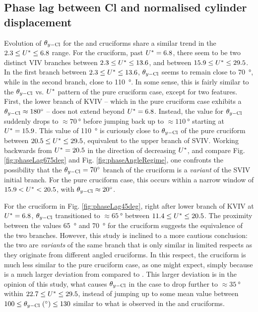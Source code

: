 \documentclass[oneside]{utmthesis}
\begin{document}
\subsection{Phase lag between Cl and normalised cylinder displacement} \label{ssec:phaseLag67545}
Evolution of $\theta_{y-\text{Cl}}$ for the \angfo{} and \angth{} cruciforms share a similar trend in the $2.3 \leq U^{*} \leq 6.8$ range. For the \angfo{} cruciform, past $U^{*} = 6.8$, there seem to be two distinct VIV branches between $2.3 \leq U^{*} \leq 13.6$, and between $15.9 \leq U^{*} \leq 29.5$. In the first branch between $2.3 \leq U^{*} \leq 13.6$, $\theta_{y-\text{Cl}}$ seems to remain close to \SI{70}{\degree}, while in the second branch, close to \SI{110}{\degree}. In some sense, this is fairly similar to the $\theta_{y-\text{Cl}}$ vs. $U^{*}$ pattern of the pure cruciform case, except for two features. First, the lower branch of KVIV -- which in the pure cruciform case exhibits a $\plag \approx \SI{180}{\degree}$ -- does not extend beyond $U^{*} = 6.8$. Instead, the value for $\theta_{y-\text{Cl}}$ suddenly drops to $\approx \SI{70}{\degree}$ before jumping back up to $\approx \SI{110}{\degree}$ starting at $U^{*} = 15.9$. This value of \SI{110}{\degree} is curiously close to $\theta_{y-\text{Cl}}$ of the pure cruciform between $20.5 \leq U^{*} \leq 29.5$, equivalent to the upper branch of SVIV. Working backwards from $U^{*} = 20.5$ in the direction of decreasing $U^{*}$, and compare Fig. \ref{fig:phaseLag675deg} and Fig. \ref{fig:phaseAngleRegime}, one confronts the possibility that the $\plag = \SI{70}{\degree}$ branch of the \angfo cruciform is a \textit{variant} of the SVIV initial branch. For the pure cruciform case, this occurs within a narrow window of $15.9 < U^{*} < 20.5$, with $\plag \approx \SI{20}{\degree}$.

For the \angth{} cruciform in Fig. \ref{fig:phaseLag45deg}, right after lower branch of KVIV at $U^{*} = 6.8$, $\theta_{y-\text{Cl}}$ transitioned to $\approx \SI{65}{\degree}$ between $11.4 \leq U^{*} \leq 20.5$. The proximity between the values \SI{65}{\degree} and \SI{70}{\degree} for the \angfo{} cruciform suggests the equivalence of the two branches. However, this study is inclined to a more cautious conclusion: the two are \textit{variants} of the same branch that is only similar in limited respects as they originate from different angled cruciforms. In this respect, the \angth{} cruciform is much less similar to the pure cruciform case, as one might expect, simply because \angth{} is a much larger deviation from \angfi{} compared to \angfo{}. This larger deviation is in the opinion of this study, what causes $\theta_{y-\text{Cl}}$ in the \angth{} case to drop further to $\approx \SI{35}{\degree}$ within $22.7 \leq U^{*} \leq 29.5$, instead of jumping up to some mean value between $100 \leq \plag \; (\si{\degree}) \leq 130$ similar to what is observed in the \angfi{} and \angfo{} cruciforms.
\end{document}
